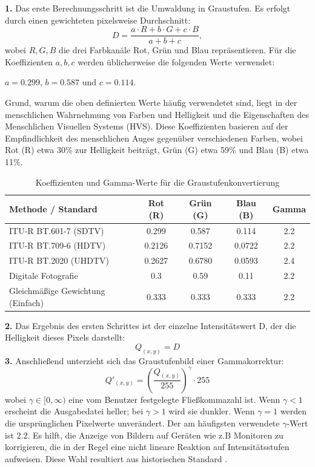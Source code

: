 \documentclass[course=erap]{aspdoc}
\begin{document}
\textbf{1.} Das erste Berechnungsschritt ist die Umwaldung in Graustufen\cite{Graust}. Es erfolgt durch einen gewichteten pixelsweise Durchschnitt: 
\begin{equation}
D = \frac{a \cdot R + b \cdot G + c \cdot B} {a + b + c} \label{eq: gamma_correction_1}, 
\end{equation}
wobei $R, G, B$ die drei Farbkanäle Rot, Grün und Blau repräsentieren. Für die Koeffizienten $a, b, c$ werden üblicherweise die folgenden Werte verwendet: 
\begin{center}
\(a = 0.299\), \(b = 0.587\) und \(c = 0.114\).\par
\end{center}
Grund, warum die oben definierten Werte häufig verwendetet sind, liegt in der menschlichen Wahrnehmung von Farben und Helligkeit\cite{ColWahr2} und die Eigenschaften des Menschlichen Visuellen Systems (HVS)\cite{ColWahr1}. Diese Koeffizienten basieren auf der Empfindlichkeit des menschlichen Auges gegenüber verschiedenen Farben, wobei Rot (R) etwa 30\% zur Helligkeit beiträgt, Grün (G) etwa 59\% und Blau (B) etwa 11\%. \par
\begin{table}[ht]
\centering
\begin{tabular}{|l|c|c|c|c|}
\hline
Methode / Standard & Rot (R) & Grün (G) & Blau (B) & Gamma \\
\hline
ITU-R BT.601-7 (SDTV) & 0.299 & 0.587 & 0.114 & 2.2 \\
ITU-R BT.709-6 (HDTV) & 0.2126 & 0.7152 & 0.0722 & 2.2 \\
ITU-R BT.2020 (UHDTV) & 0.2627 & 0.6780 & 0.0593 & 2.4 \\
Digitale Fotografie & 0.3 & 0.59 & 0.11 & 2.2 \\
Gleichmäßige Gewichtung (Einfach) & 0.333 & 0.333 & 0.333 & 2.2 \\
\hline
\end{tabular}
\caption{Koeffizienten und Gamma-Werte für die Graustufenkonvertierung\cite{ITU_INT}}
\label{tab:grayscale_conversion}
\end{table}
\textbf{2.} Das Ergebnis des ersten Schrittes ist der einzelne Intensitätswert D, der die Helligkeit dieses Pixels darstellt:
\begin{equation}
Q_(x,y) = D
\end{equation} 
\textbf{3.} Anschließend unterzieht sich das Graustufenbild einer Gammakorrektur:
\begin{equation}
Q'_(x,y) = \left(\frac{Q_(x,y)}{255}\right)^\gamma \cdot 255 \label{eq: gamma_correction}
\end{equation}
wobei $\gamma \in [0, \infty)$ eine vom Benutzer festgelegte Fließkommazahl ist. Wenn $\gamma < 1$ erscheint die Ausgabedatei heller; bei $\gamma > 1$ wird sie dunkler. Wenn $\gamma = 1$ werden die ursprünglichen Pixelwerte unverändert\cite{GammaGraphik}. Der am häufigsten verwendete $\gamma$-Wert ist $2.2$. Es hilft, die Anzeige von Bildern auf Geräten wie z.B Monitoren zu korrigieren, die in der Regel eine nicht lineare Reaktion auf Intensitätsstufen aufweisen. Diese Wahl resultiert aus historischen Standard \cite{DigBildVer}.\par
\end{document}
